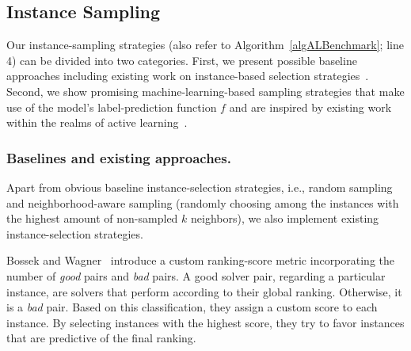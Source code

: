 \documentclass[runningheads]{llncs}
\begin{document}
\subsection{Instance Sampling}
\label{sec:main2}
Our instance-sampling strategies (also refer to Algorithm~\ref{algALBenchmark}; line 4) can be divided into two categories.
First, we present possible baseline approaches including existing work on instance-based selection strategies~\cite{Bossek021a,GentHJKMNN14,MatriconAFSH21}.
Second, we show promising machine-learning-based sampling strategies that make use of the model's label-prediction function $f$ and are inspired by existing work within the realms of active learning~\cite{settles2009active}.

\subsubsection{Baselines and existing approaches.}
\label{sec:sampling1}
Apart from obvious baseline instance-selection strategies, i.e., random sampling and neighborhood-aware sampling (randomly choosing among the instances with the highest amount of non-sampled $k$ neighbors), we also implement existing instance-selection strategies.

Bossek and Wagner~\cite{Bossek021a} introduce a custom ranking-score metric incorporating the number of \emph{good} pairs and \emph{bad} pairs.
A good solver pair, regarding a particular instance, are solvers that perform according to their global ranking.
Otherwise, it is a \emph{bad} pair.
Based on this classification, they assign a custom score to each instance.
By selecting instances with the highest score, they try to favor instances that are predictive of the final ranking.
\end{document}
